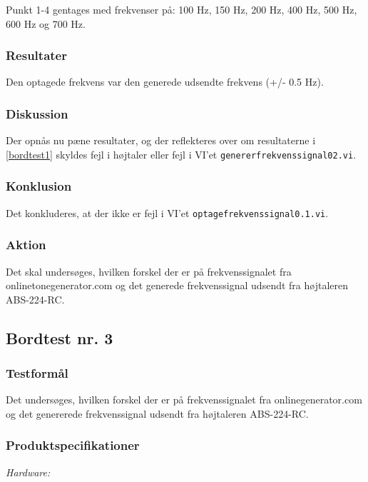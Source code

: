 			Punkt 1-4 gentages med frekvenser på: 100 Hz, 150 Hz, 200 Hz, 400 Hz, 500 Hz, 600 Hz og 700 Hz. 
			
			\subsubsection{Resultater}
			Den optagede frekvens var den generede udsendte frekvens (+/- 0.5 Hz). 
			\subsubsection{Diskussion}
			Der opnås nu pæne resultater, og der reflekteres over om resultaterne i \ref{bordtest1} skyldes fejl i højtaler eller fejl i VI'et \texttt{genererfrekvenssignal02.vi}. 
			\subsubsection{Konklusion}
			Det konkluderes, at der ikke er fejl i VI'et \texttt{optagefrekvenssignal0.1.vi}. 
			\subsubsection{Aktion}
			Det skal undersøges, hvilken forskel der er på frekvenssignalet fra onlinetonegenerator.com og det generede frekvenssignal udsendt fra højtaleren ABS-224-RC.  
	
		\subsection{Bordtest nr. 3} %
		\subsubsection{Testformål}
		Det undersøges, hvilken forskel der er på frekvenssignalet fra onlinegenerator.com og det genererede frekvenssignal udsendt fra højtaleren ABS-224-RC.  
		
		\subsubsection{Produktspecifikationer}
		
		\textit{Hardware:}\\
		\\
		\hojtalerkabel\\
		\pins\\
		\krympeflex
		\arduino\\
		\usbkabel\\
		\PC\\
		\mikrofon\\
	
